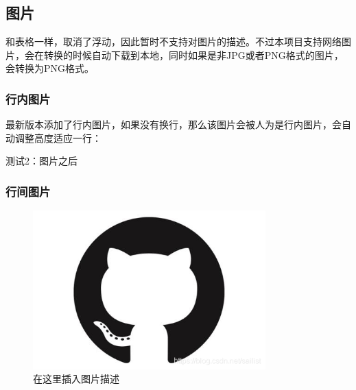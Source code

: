 \documentclass{article}%
\begin{document}
%
\subsection{图片}%

%
和表格一样，取消了浮动，因此暂时不支持对图片的描述。不过本项目支持网络图片，会在转换的时候自动下载到本地，同时如果是非JPG或者PNG格式的图片，会转换为PNG格式。%

%
\subsubsection{行内图片}%

%

%
最新版本添加了行内图片，如果没有换行，那么该图片会被人为是行内图片，会自动调整高度适应一行：%

%
测试2：图片之后%

%
\subsubsection{行间图片}%

%

%
\begin{center}%


\begin{figure}[h]%
%
\includegraphics[width=0.8\textwidth]{imgs/1c59f8ef2aa3c5e527a22b7c258489d6.png}%
\caption{在这里插入图片描述}%
\end{figure}

%
\end{center}%
\end{document}
